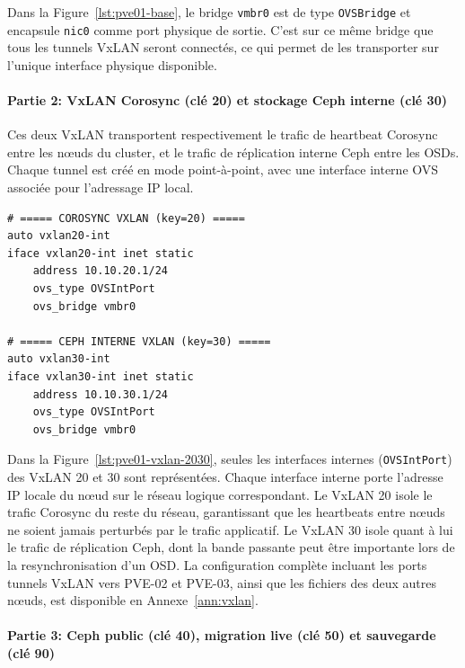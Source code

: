 \par Dans la Figure~\ref{lst:pve01-base}, le bridge \texttt{vmbr0} est de type \texttt{OVSBridge} et encapsule \texttt{nic0} comme port physique de sortie. C'est sur ce même bridge que tous les tunnels VxLAN seront connectés, ce qui permet de les transporter sur l'unique interface physique disponible.\\

\paragraph{Partie 2: VxLAN Corosync (clé 20) et stockage Ceph interne (clé 30)}

\par Ces deux VxLAN transportent respectivement le trafic de heartbeat Corosync entre les nœuds du cluster, et le trafic de réplication interne Ceph entre les OSDs. Chaque tunnel est créé en mode point-à-point, avec une interface interne OVS associée pour l'adressage IP local.\\

\begin{lstlisting}[style=sonacode,language={},caption={VxLAN Corosync (clé 20) et Ceph interne (clé 30) - interfaces internes PVE-01},label={lst:pve01-vxlan-2030}]
# ===== COROSYNC VXLAN (key=20) =====
auto vxlan20-int
iface vxlan20-int inet static
    address 10.10.20.1/24
    ovs_type OVSIntPort
    ovs_bridge vmbr0

# ===== CEPH INTERNE VXLAN (key=30) =====
auto vxlan30-int
iface vxlan30-int inet static
    address 10.10.30.1/24
    ovs_type OVSIntPort
    ovs_bridge vmbr0
\end{lstlisting}

\par Dans la Figure~\ref{lst:pve01-vxlan-2030}, seules les interfaces internes (\texttt{OVSIntPort}) des VxLAN 20 et 30 sont représentées. Chaque interface interne porte l'adresse IP locale du nœud sur le réseau logique correspondant. Le VxLAN 20 isole le trafic Corosync du reste du réseau, garantissant que les heartbeats entre nœuds ne soient jamais perturbés par le trafic applicatif. Le VxLAN 30 isole quant à lui le trafic de réplication Ceph, dont la bande passante peut être importante lors de la resynchronisation d'un OSD. La configuration complète incluant les ports tunnels VxLAN vers PVE-02 et PVE-03, ainsi que les fichiers des deux autres nœuds, est disponible en Annexe~\ref{ann:vxlan}.\\

\paragraph{Partie 3: Ceph public (clé 40), migration live (clé 50) et sauvegarde (clé 90)}


